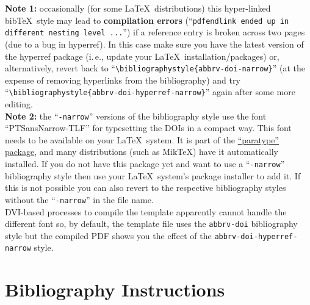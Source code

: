 \documentclass[journal]{vgtc}                %
\begin{document}
\begin{itemize}
\textbf{Note 1:} occasionally (for some \LaTeX\ distributions) this hyper-linked bib\TeX\ style may lead to \textbf{compilation errors} (``\texttt{pdfendlink ended up in different nesting level ...}'') if a reference entry is broken across two pages (due to a bug in hyperref). In this case make sure you have the latest version of the hyperref package (i.\,e., update your \LaTeX\ installation/packages) or, alternatively, revert back to ``\texttt{\textbackslash bibliographystyle\{abbrv-doi-narrow\}}'' (at the expense of removing hyperlinks from the bibliography) and try ``\texttt{\textbackslash bibliographystyle\{abbrv-doi-hyperref-narrow\}}'' again after some more editing.\\[1em]
\textbf{Note 2:} the ``\texttt{-narrow}'' versions of the bibliography style use the font ``PTSansNarrow-TLF'' for typesetting the DOIs in a compact way. This font needs to be available on your \LaTeX\ system. It is part of the \href{https://www.ctan.org/pkg/paratype}{``paratype'' package}, and many distributions (such as MikTeX) have it automatically installed. If you do not have this package yet and want to use a ``\texttt{-narrow}'' bibliography style then use your \LaTeX\ system's package installer to add it. If this is not possible you can also revert to the respective bibliography styles without the ``\texttt{-narrow}'' in the file name.\\[1em]
DVI-based processes to compile the template apparently cannot handle the different font so, by default, the template file uses the \texttt{abbrv-doi} bibliography style but the compiled PDF shows you the effect of the \texttt{abbrv-doi-hyperref-narrow} style.
\end{itemize}

\section{Bibliography Instructions}
\end{document}
